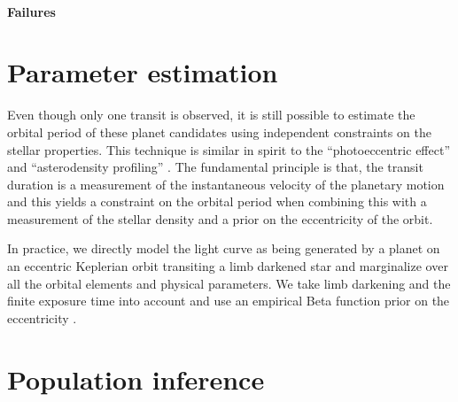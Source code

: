 \documentclass[12pt,preprint]{aastex}
\begin{document}
\paragraph{Failures}


\section{Parameter estimation}

Even though only one transit is observed, it is still possible to estimate the
orbital period of these planet candidates using independent constraints on the
stellar properties.
This technique is similar in spirit to the ``photoeccentric effect''
\citep{Dawson:2012} and ``asterodensity profiling'' \citep{Kipping:2012}.
The fundamental principle is that, the transit duration is a measurement of
the instantaneous velocity of the planetary motion and this yields a
constraint on the orbital period when combining this with a measurement of the
stellar density and a prior on the eccentricity of the orbit.

In practice, we directly model the light curve as being generated by a planet
on an eccentric Keplerian orbit transiting a limb darkened star and
marginalize over all the orbital elements and physical parameters.
We take limb darkening and the finite exposure time into account
\citep{Mandel:2002, Kipping:2010, Kipping:2013} and use an empirical
Beta function prior on the eccentricity \citep{Kipping:2013a}.


\section{Population inference}
\end{document}
